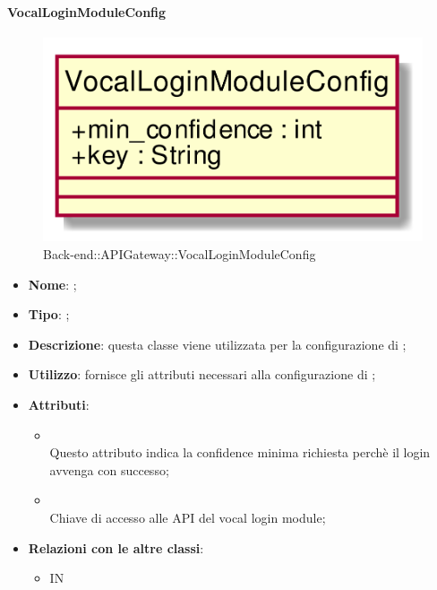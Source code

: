 \hypertarget{VocalLoginModuleConfig_label}{\paragraph{VocalLoginModuleConfig}}
\begin{figure}[h]
	\centering
	\includegraphics[width=\textwidth,height=\textheight,keepaspectratio]{images/ClassVocalLoginModuleConfig.png}
	\caption{Back-end::APIGateway::VocalLoginModuleConfig}
\end{figure}
\begin{itemize}
	\item \textbf{Nome}: ;
	\item \textbf{Tipo}: ;
	\item \textbf{Descrizione}: questa classe viene utilizzata per la configurazione di ;
	\item \textbf{Utilizzo}: fornisce gli attributi necessari alla configurazione di ;
	\item \textbf{Attributi}:
	\begin{itemize}
		\item[]  \\
		Questo attributo indica la confidence minima richiesta perchè il login avvenga con successo;
		\item[]  \\
		Chiave di accesso alle API del vocal login module;
	\end{itemize}
	\item \textbf{Relazioni con le altre classi}:
	\begin{itemize}
		\item IN \hyperlink{VocalLoginMicrosoftModule_label}{}
	\end{itemize}
\end{itemize}
\FloatBarrier

